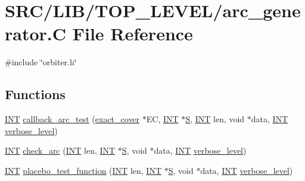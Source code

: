 \hypertarget{arc__generator_8_c}{}\section{S\+R\+C/\+L\+I\+B/\+T\+O\+P\+\_\+\+L\+E\+V\+E\+L/arc\+\_\+generator.C File Reference}
\label{arc__generator_8_c}
{\ttfamily \#include \char`\"{}orbiter.\+h\char`\"{}}\newline
\subsection*{Functions}
\begin{DoxyCompactItemize}
\item 
\mbox{\hyperlink{galois_8h_a09fddde158a3a20bd2dcadb609de11dc}{I\+NT}} \mbox{\hyperlink{arc__generator_8_c_ac540f3bc6459db7353c7b5c911c0694f}{callback\+\_\+arc\+\_\+test}} (\mbox{\hyperlink{classexact__cover}{exact\+\_\+cover}} $\ast$EC, \mbox{\hyperlink{galois_8h_a09fddde158a3a20bd2dcadb609de11dc}{I\+NT}} $\ast$\mbox{\hyperlink{simeon_8_c_adab47f8243f1b5a2c31df2535d6b37d0}{S}}, \mbox{\hyperlink{galois_8h_a09fddde158a3a20bd2dcadb609de11dc}{I\+NT}} len, void $\ast$data, \mbox{\hyperlink{galois_8h_a09fddde158a3a20bd2dcadb609de11dc}{I\+NT}} \mbox{\hyperlink{simeon_8_c_a818073fbcc2f439e7c56952f67386122}{verbose\+\_\+level}})
\item 
\mbox{\hyperlink{galois_8h_a09fddde158a3a20bd2dcadb609de11dc}{I\+NT}} \mbox{\hyperlink{arc__generator_8_c_ae2a65ef645b4b5b21499c247a4e19913}{check\+\_\+arc}} (\mbox{\hyperlink{galois_8h_a09fddde158a3a20bd2dcadb609de11dc}{I\+NT}} len, \mbox{\hyperlink{galois_8h_a09fddde158a3a20bd2dcadb609de11dc}{I\+NT}} $\ast$\mbox{\hyperlink{simeon_8_c_adab47f8243f1b5a2c31df2535d6b37d0}{S}}, void $\ast$data, \mbox{\hyperlink{galois_8h_a09fddde158a3a20bd2dcadb609de11dc}{I\+NT}} \mbox{\hyperlink{simeon_8_c_a818073fbcc2f439e7c56952f67386122}{verbose\+\_\+level}})
\item 
\mbox{\hyperlink{galois_8h_a09fddde158a3a20bd2dcadb609de11dc}{I\+NT}} \mbox{\hyperlink{arc__generator_8_c_a8bc0fcb8c8ce7d1392279a4423c9d0a2}{placebo\+\_\+test\+\_\+function}} (\mbox{\hyperlink{galois_8h_a09fddde158a3a20bd2dcadb609de11dc}{I\+NT}} len, \mbox{\hyperlink{galois_8h_a09fddde158a3a20bd2dcadb609de11dc}{I\+NT}} $\ast$\mbox{\hyperlink{simeon_8_c_adab47f8243f1b5a2c31df2535d6b37d0}{S}}, void $\ast$data, \mbox{\hyperlink{galois_8h_a09fddde158a3a20bd2dcadb609de11dc}{I\+NT}} \mbox{\hyperlink{simeon_8_c_a818073fbcc2f439e7c56952f67386122}{verbose\+\_\+level}})

\end{DoxyCompactItemize}
